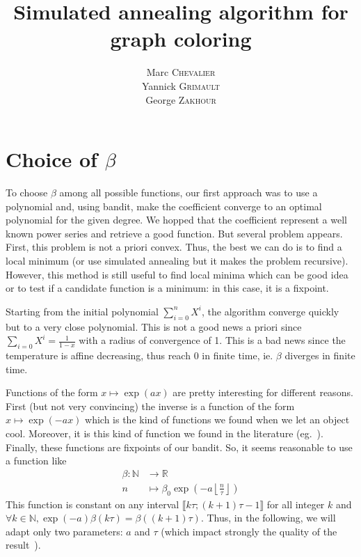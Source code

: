 \documentclass[a4paper, 11pt]{article}
\title{Simulated annealing algorithm for graph coloring}
\author{
	Marc \textsc{Chevalier}\\
	Yannick \textsc{Grimault}\\
	George \textsc{Zakhour}
}
\newcommand{\RR}{\mathbb{R}}
\newcommand{\NN}{\mathbb{N}}
\begin{document}
\maketitle

\section{Choice of \texorpdfstring{$\beta$}{β}}


To choose $\beta$ among all possible functions, our first approach was to use a polynomial and, using bandit, make the coefficient converge to an optimal polynomial for the given degree. We hopped that the coefficient represent a well known power series and retrieve a good function. But several problem appears. First, this problem is not a priori convex. Thus, the best we can do is to find a local minimum (or use simulated annealing but it makes the problem recursive). However, this method is still useful to find local minima which can be good idea or to test if a candidate function is a minimum: in this case, it is a fixpoint.

Starting from the initial polynomial $\sum\limits_{i=0}^n X^i$, the algorithm converge quickly but to a very close polynomial. This is not a good news a priori since $\sum\limits_{i=0} X^i = \frac{1}{1-x}$ with a radius of convergence of 1. This is a bad news since the temperature is affine decreasing, thus reach 0 in finite time, ie. $\beta$ diverges in finite time.

\bigskip

Functions of the form $x\mapsto \exp(ax)$ are pretty interesting for different reasons. First (but not very convincing) the inverse is a function of the form $x\mapsto \exp(-ax)$ which is the kind of functions we found when we let an object cool. Moreover, it is this kind of function we found in the literature (eg.~\cite{chams1987some}). Finally, these functions are fixpoints of our bandit. So, it seems reasonable to use a function like
\[
	\begin{aligned}
		\beta : \NN &\to \RR\\
		n &\mapsto \beta_0\exp\left(-a\left\lfloor \frac{n}{\tau} \right\rfloor \right)
	\end{aligned}
\]
This function is constant on any interval $\llbracket k\tau; (k+1)\tau -1\rrbracket$ for all integer $k$ and $\forall k\in\NN, \exp(-a)\beta(k\tau) = \beta((k+1)\tau)$. Thus, in the following, we will adapt only two parameters: $a$ and $\tau$ (which impact strongly the quality of the result~\cite{chams1987some}).
\end{document}
